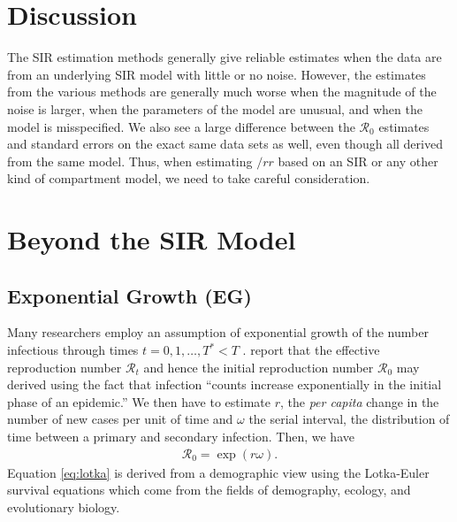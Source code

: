 \documentclass[12pt]{article}
\newcommand{\rr}{\ensuremath{\mathcal{R}_0}}
\begin{document}
\section{Discussion}\label{sec:discussion}

The SIR estimation methods generally give reliable estimates when the data are from an underlying SIR model with little or no noise. However, the estimates from the various methods are generally much worse when the magnitude of the noise is larger, when the parameters of the model are unusual, and when the model is misspecified. We also see a large difference between the $\rr$ estimates and standard errors on the exact same data sets as well, even though all derived from the same model. Thus, when estimating $/rr$ based on an SIR or any other kind of compartment model, we need to take careful consideration.





\appendix

\section{Beyond the SIR Model}


\subsection{Exponential Growth (EG)}\label{sec:expgrowth}
Many researchers employ an assumption of exponential growth of the number infectious through times $t=0, 1, \dots, T^* <T$ \citep{wallinga2007generation,fisman2014,nishiura2016,majumder2016,towers2016}.
\cite{wallinga2007generation} report that the effective reproduction number $\mathcal{R}_t$ and hence the initial reproduction number $\rr$ may derived using the fact that infection ``counts increase exponentially in the initial phase of an epidemic.''  We then have to estimate $r$, the \textit{per capita} change in the number of new cases per unit of time and $\omega$ the serial interval, the distribution of time between a primary and secondary infection. Then, we have
\begin{align}\label{eq:lotka}
\rr = \exp{(r \omega)}.
\end{align}
Equation \eqref{eq:lotka} is derived from a demographic view using the Lotka-Euler survival equations which come from the fields of demography, ecology, and evolutionary biology.
\end{document}
